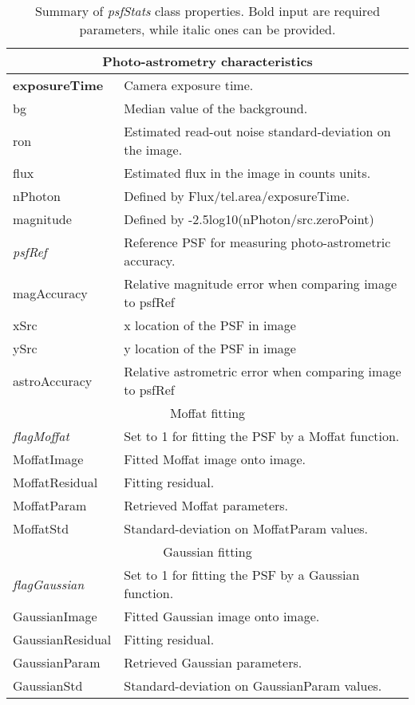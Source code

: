\documentclass[12pt]{article}
\begin{document}
\begin{table}[h!]
\begin{tabular}{lp{15cm}}
	\hline
	 \multicolumn{2}{c}{Photo-astrometry characteristics} \\
	\hline
	\textbf{exposureTime}& Camera exposure time.\\
	bg& Median value of the background.\\
	ron& Estimated read-out noise standard-deviation on the image. \\
	flux& Estimated flux in the image in counts units.\\
	nPhoton& Defined by Flux/tel.area/exposureTime.\\
	magnitude& Defined by -2.5log10(nPhoton/src.zeroPoint)\\
	\emph{psfRef}& Reference PSF for measuring photo-astrometric accuracy.\\
	magAccuracy& Relative magnitude error when comparing image to psfRef\\
	xSrc& x location of the PSF in image\\
	ySrc& y location of the PSF in image\\
	astroAccuracy& Relative astrometric error when comparing image to psfRef\\
	\hline
	\multicolumn{2}{c}{Moffat fitting} \\
	\hline
	\emph{flagMoffat}& Set to 1 for fitting the PSF by a Moffat function.\\
	MoffatImage& Fitted Moffat image onto image.\\
	MoffatResidual& Fitting residual.\\
	MoffatParam& Retrieved Moffat parameters.\\
	MoffatStd& Standard-deviation on MoffatParam values.\\	
	\hline
	\multicolumn{2}{c}{Gaussian fitting} \\
	\hline
	\emph{flagGaussian}& Set to 1 for fitting the PSF by a Gaussian function. \\
	GaussianImage& Fitted Gaussian image onto image.\\
	GaussianResidual& Fitting residual.\\
	GaussianParam& Retrieved Gaussian parameters.\\
	GaussianStd& Standard-deviation on GaussianParam values.\\	
	\end{tabular}
\caption{Summary of \emph{psfStats} class properties. Bold input are required parameters, while italic ones can be provided.}
\end{table}
\end{document}
